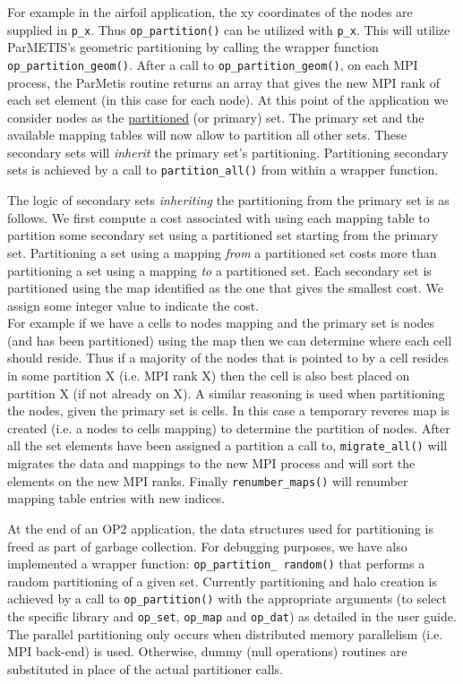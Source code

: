 \documentclass[11pt]{article}
\begin{document}
\indent For example in the airfoil application, the xy coordinates of the nodes are supplied in \texttt{p\_x}. Thus
\texttt{op\_partition()} can be utilized with \texttt{p\_x}. This will utilize ParMETIS's geometric partitioning by
calling the wrapper function \texttt{op\_partition\_geom()}. After a call to \texttt{op\_partition\_geom()}, on
each MPI process, the ParMetis routine returns an array that gives the new MPI rank of each set element (in this case
for each node). At this point of the application we consider nodes as the \underline{partitioned} (or primary) set. The
primary set and the available mapping tables will now allow to partition all other sets. These secondary sets will
\textit{inherit} the primary set's partitioning. Partitioning secondary sets is achieved by a call to
\texttt{partition\_all()} from within a wrapper function.

The logic of secondary sets \textit{inheriting} the partitioning from the primary set is as follows. We first compute a
cost associated with using each mapping table to partition some secondary set using a partitioned set starting from
the primary set. Partitioning a set using a mapping \textit{from} a partitioned set costs more than partitioning a set
using a mapping \textit{to} a partitioned set. Each secondary set is partitioned using the map identified as the one
that gives the smallest cost. We assign some integer value to indicate the cost. \\

For example if we have a cells to nodes mapping and the primary set is nodes (and has been partitioned) using the
map then we can determine where each cell should reside. Thus if a majority of the nodes that is pointed to by a cell
resides in some partition X (i.e. MPI rank X) then the cell is also best placed on partition X (if not already on X). A
similar reasoning is used when partitioning the nodes, given the primary set is cells. In this case a temporary reveres
map is created (i.e. a nodes to cells mapping) to determine the partition of nodes. After all the set elements have been
assigned a partition a call to, \texttt{migrate\_all()} will migrates the data and mappings to the new MPI process and
will sort the elements on the new MPI ranks. Finally \texttt{renumber\_maps()} will renumber mapping table entries with
new indices.

\indent At the end of an OP2 application, the data structures used for partitioning is freed as part of garbage
collection. For debugging purposes, we have also implemented a wrapper function: \texttt{op\_partition\_ random()} that
performs a random partitioning of a given set. Currently partitioning and halo creation is achieved by a call to
\texttt{op\_partition()} with the appropriate arguments (to select the specific library and \texttt{op\_set},
\texttt{op\_map} and \texttt{op\_dat}) as detailed in the user guide. The parallel partitioning only occurs when
distributed memory parallelism (i.e. MPI back-end) is used. Otherwise, dummy (null operations) routines are substituted
in place of the actual partitioner calls.
\end{document}

